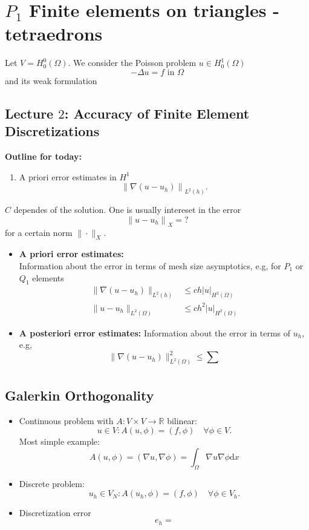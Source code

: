 \documentclass[openany,a4paper,11pt]{memoir}
\theoremstyle{definition}
\begin{document}


\chapter{$P_1$ Finite elements on triangles - tetraedrons}
Let $V=H^0_0\left(\Omega\right)$. We consider the Poisson problem $u\in H^1_0\left(\Omega\right)$ \[-\Delta u=f\text{ in }\Omega \] and its weak formulation %
\section{Lecture $2$: Accuracy of Finite Element Discretizations}

\textbf{Outline for today:}

\begin{enumerate}
\item A priori error estimates in $H^{1}$ \[ {\|\nabla(u-u_h)\|}_{L^{2}(h)}. \]
\end{enumerate}

$C$ dependes of the solution. One is usually intereset in the error \[ {\|u-u_{h}\|}_{X}=? \] for a certain norm $\|\cdot\|_{X}$.
\begin{itemize}
\item \textbf{A priori error estimates:}\\ Information about the error in terms of mesh size asymptotics, e.g, for $P_{1}$ or $Q_{1}$ elements
  \begin{align*}
    \|\nabla\left(u-u_{h}\right)\|_{L^{2}(h)}&\le ch{|u|}_{H^{2}(\Omega)} \\
    \|u-u_{h}\|_{L^{2}(\Omega)}&\le ch^{2}{|u|}_{H^2(\Omega)}
  \end{align*}
\item \textbf{A posteriori error estimates:} Information about the error in terms of $u_{h}$, e.g, \[ \|\nabla(u-u_{h})\|^{2}_{L^{2}(\Omega)}\le \sum_{}\]
\end{itemize}

\section{Galerkin Orthogonality}

\begin{itemize}
\item Continuous problem with $A\colon V\times V\rightarrow\mathbb{R}$ bilinear: \[ u\in V\colon A\left(u,\phi\right)=\left(f,\phi\right)\quad\forall\phi\in V. \] Most simple example: \[ A\left(u,\phi\right)=\left(\nabla u,\nabla\phi\right)=\int_{\Omega}\nabla u\nabla\phi\mathrm{d}x \]
\item Discrete problem: \[ u_{h}\in V_{N}\colon A\left(u_h,\phi\right)=\left(f,\phi\right)\quad\forall\phi\in V_{h}. \]
  
\item Discretization error \[ e_{h}= \]
\end{itemize}
\end{document}
